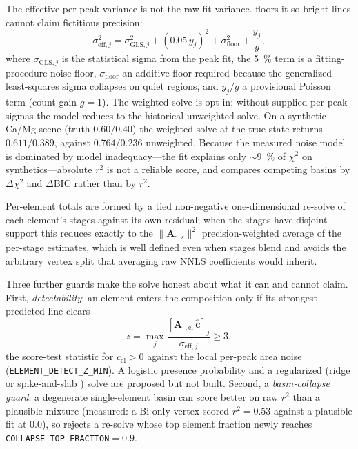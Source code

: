 The effective per-peak variance is not the raw fit variance. \alibz{} floors it so
bright lines cannot claim fictitious precision:
%
\begin{equation}
  \label{eq:sigma-eff}
  \sigma_{\mathrm{eff},j}^2 =
    \sigma_{\mathrm{GLS},j}^2
    + (0.05\,y_j)^2
    + \sigma_\mathrm{floor}^2
    + \frac{y_j}{g},
\end{equation}
%
where $\sigma_{\mathrm{GLS},j}$ is the statistical sigma from the peak fit, the
\SI{5}{\percent} term is a fitting-procedure noise floor, $\sigma_\mathrm{floor}$ an
additive floor required because the generalized-least-squares sigma collapses on quiet
regions, and $y_j/g$ a provisional Poisson term (count gain $g=1$). The weighted solve
is opt-in; without supplied per-peak sigmas the model reduces to the historical
unweighted solve. On a synthetic Ca/Mg scene (truth $0.60/0.40$) the weighted solve at
the true state returns $0.611/0.389$, against $0.764/0.236$ unweighted. Because the
measured noise model is dominated by model inadequacy---the fit explains only
$\sim$\SI{9}{\percent} of $\chi^2$ on synthetics---absolute $r^2$ is not a reliable
score, and \alibz{} compares competing basins by $\Delta\chi^2$ and $\Delta$BIC
\citep{schwarz1978bic} rather than by $r^2$.

Per-element totals are formed by a tied non-negative one-dimensional re-solve of each
element's stages against its own residual; when the stages have disjoint support this
reduces exactly to the $\lVert\mathbf{A}_{:,s}\rVert^2$ precision-weighted average of
the per-stage estimates, which is well defined even when stages blend and avoids the
arbitrary vertex split that averaging raw NNLS coefficients would inherit.

Three further guards make the solve honest about what it can and cannot claim. First,
\emph{detectability}: an element enters the composition only if its strongest predicted
line clears
%
\begin{equation}
  \label{eq:detect}
  z = \max_j \frac{[\mathbf{A}_{:,\mathrm{el}}\,\hat{\mathbf{c}}]_j}{\sigma_{\mathrm{eff},j}}
    \ge 3,
\end{equation}
%
the score-test statistic for $c_\mathrm{el}>0$ against the local per-peak area noise
(\texttt{ELEMENT\_DETECT\_Z\_MIN}). A logistic presence probability and a regularized
(ridge or spike-and-slab \citep{mitchell1988spikeslab,george1993ssvs}) solve are proposed
but not built. Second, a
\emph{basin-collapse guard}: a degenerate single-element basin can score better on raw
$r^2$ than a plausible mixture (measured: a Bi-only vertex scored $r^2=0.53$ against a
plausible fit at $0.0$), so \alibz{} rejects a re-solve whose top element fraction
newly reaches \texttt{COLLAPSE\_TOP\_FRACTION}$=0.9$.

